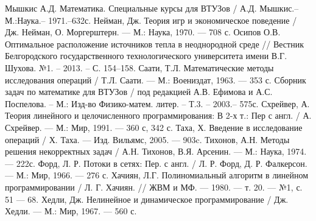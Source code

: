 \begin{thebibliography}{99}
Мышкис А.Д. Математика. Специальные курсы для ВТУЗов / А.Д. Мышкис.– М.:Наука.– 1971.–632с.
Нейман, Дж. Теория игр и экономическое поведение / Дж. Нейман, О. Моргерштерн. — М.: Наука, 1970. — 708 с.
Осипов О.В. Оптимальное расположение источников тепла в неоднородной среде // Вестник Белгородского государственного технологического университета имени В.Г. Шухова. №1. – 2013. – С. 154–158.
Саати, Т.Л.  Математические методы исследования операций / Т.Л. Саати. — М.: Воениздат, 1963. — 353 с.
Сборник задач по математике для ВТУЗов / под редакцией А.В. Ефимова и А.С. Поспелова. – М.: Изд-во Физико-матем. литер. – Т.3. – 2003.– 575с.
Схрейвер, А. Теория линейного и целочисленного программирования: В 2-х т.: Пер с англ. / А. Схрейвер. — М.: Мир, 1991. — 360 с, 342 с.
Таха, Х. Введение в исследование операций / Х. Таха. — Изд. Вильямс, 2005. — 903c.
Тихонов, А.Н. Методы решения некорректных задач / А.Н. Тихонов, В.Я. Арсенин. — М.: Наука, 1974. — 222с.
Форд, Л. Р.  Потоки  в  сетях:  Пер.  с  англ. / Л. Р. Форд,  Д. Р. Фалкерсон. — М.: Мир, 1966. — 276 с.
Хачиян, Л.Г. Полиномиальный алгоритм в линейном программировании  /  Л. Г.  Хачиян.  //  ЖВМ  и  МФ.  —  1980.  — т. 20. — №1, с. 51 — 68.
Хедли, Дж. Нелинейное и динамическое программирование / Дж. Хедли. — М.: Мир, 1967. — 560 с.
\end{thebibliography}
